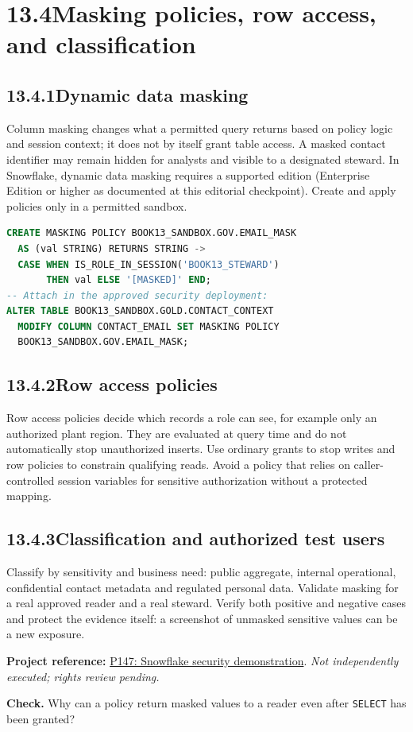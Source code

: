 \documentclass[11pt,twoside]{article}
\newcommand{\topic}[2]{\subsection*{#1\quad #2}}
\newcommand{\repo}[2]{\par\begingroup\fontsize{8.0}{9.6}\selectfont\sffamily\color{inkgray}\textbf{Project reference:} \href{#2}{#1}. \textit{Not independently executed; rights review pending.}\par\endgroup}
\begin{document}
\section*{13.4\quad Masking policies, row access, and classification}
\topic{13.4.1}{Dynamic data masking}
Column masking changes what a permitted query returns based on policy logic and session context; it does not by itself grant table access. A masked contact identifier may remain hidden for analysts and visible to a designated steward. In Snowflake, dynamic data masking requires a supported edition (Enterprise Edition or higher as documented at this editorial checkpoint). Create and apply policies only in a permitted sandbox.
\begin{lstlisting}[language=SQL,caption={Illustrative masking policy; requires approved security role.}]
CREATE MASKING POLICY BOOK13_SANDBOX.GOV.EMAIL_MASK
  AS (val STRING) RETURNS STRING ->
  CASE WHEN IS_ROLE_IN_SESSION('BOOK13_STEWARD')
       THEN val ELSE '[MASKED]' END;
-- Attach in the approved security deployment:
ALTER TABLE BOOK13_SANDBOX.GOLD.CONTACT_CONTEXT
  MODIFY COLUMN CONTACT_EMAIL SET MASKING POLICY
  BOOK13_SANDBOX.GOV.EMAIL_MASK;
\end{lstlisting}
\topic{13.4.2}{Row access policies}
Row access policies decide which records a role can see, for example only an authorized plant region. They are evaluated at query time and do not automatically stop unauthorized inserts. Use ordinary grants to stop writes and row policies to constrain qualifying reads. Avoid a policy that relies on caller-controlled session variables for sensitive authorization without a protected mapping.
\topic{13.4.3}{Classification and authorized test users}
Classify by sensitivity and business need: public aggregate, internal operational, confidential contact metadata and regulated personal data. Validate masking for a real approved reader and a real steward. Verify both positive and negative cases and protect the evidence itself: a screenshot of unmasked sensitive values can be a new exposure.
\repo{P147: Snowflake security demonstration}{https://github.com/aballingall/snowflake-security-demo}
\textbf{Check.} Why can a policy return masked values to a reader even after \texttt{SELECT} has been granted?
\newpage
\end{document}
